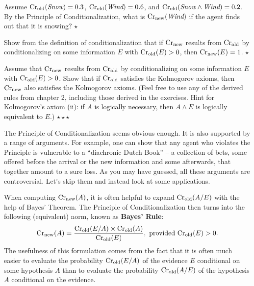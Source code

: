 \begin{exercise}
  Assume $\text{Cr$_{\text{old}}$}(\emph{Snow}) = 0.3$, $\text{Cr$_{\text{old}}$}(\emph{Wind}) = 0.6$, and
  $\text{Cr$_{\text{old}}$}(\emph{Snow} \land \emph{Wind}) = 0.2$. By the Principle of
  Conditionalization, what is $\text{Cr$_{\text{new}}$}(\emph{Wind})$ if the agent finds
  out that it is snowing? $\star$
\end{exercise}


\begin{exercise}
  Show from the definition of conditionalization that if $\text{Cr$_{\text{new}}$}$
  results from $\text{Cr$_{\text{old}}$}$ by conditionalizing on some information $E$ with
  $\text{Cr$_{\text{old}}$}(E) > 0$, then $\text{Cr$_{\text{new}}$}(E) = 1$. $\star$
\end{exercise}



  

\begin{exercise}
  Assume that $\text{Cr$_{\text{new}}$}$ results from $\text{Cr$_{\text{old}}$}$ by conditionalizing on some
  information $E$ with $\text{Cr$_{\text{old}}$}(E) > 0$. Show that if $\text{Cr$_{\text{old}}$}$ satisfies
  the Kolmogorov axioms, then $\text{Cr$_{\text{new}}$}$ also satisfies the Kolmogorov
  axioms. (Feel free to use any of the derived rules from chapter 2,
  including those derived in the exercises. Hint for Kolmogorov's
  axiom (ii): if $A$ is logically necessary, then $A\land E$ is
  logically equivalent to $E$.) $\star\star\star$
\end{exercise}


The Principle of Conditionalization seems obvious enough. It is also
supported by a range of arguments. For example, one can show that any
agent who violates the Principle is vulnerable to a ``diachronic Dutch
Book'' -- a collection of bets, some offered before the arrival or the
new information and some afterwards, that together amount to a sure
loss. As you may have guessed, all these arguments are
controversial. Let's skip them and instead look at some applications.

When computing $\text{Cr}_\text{new}(A)$, it is often helpful to expand
$\text{Cr}_\text{old}(A/E)$ with the help of Bayes' Theorem. The Principle
of Conditionalization then turns into the following (equivalent) norm,
known as \textbf{Bayes' Rule}:
%
\[
\text{Cr}_{\text{new}}(A) = \frac{\text{Cr}_{\text{old}}(E/A) \times \text{Cr}_{\text{old}}(A)}{\text{Cr}_{\text{old}}(E)}, \text{ provided $\text{Cr}_\text{old}(E) > 0$}.
\]
%
The usefulness of this formulation comes from the fact that it is
often much easier to evaluate the probability $\text{Cr$_{\text{old}}$}(E/A)$ of the
evidence $E$ conditional on some hypothesis $A$  than to
evaluate the probability $\text{Cr$_{\text{old}}$}(A/E)$ of the hypothesis $A$ conditional
on the evidence.

